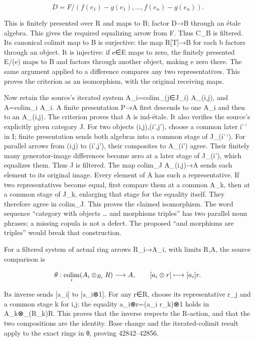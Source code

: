 \[
D=F/(f(e_1)-g(e_1),\ldots,f(e_n)-g(e_n)).
\]

This is finitely presented over R and maps to B; factor D→B through an étale algebra. This gives the required equalizing arrow from F. Thus C\_B is filtered. Its canonical colimit map to B is surjective: the map R{[}T{]}→B for each b factors through an object. It is injective: if e∈E maps to zero, the finitely presented E/(e) maps to B and factors through another object, making e zero there. The same argument applied to a difference compares any two representatives. This proves the criterion as an isomorphism, with the original receiving maps.

Now retain the source's iterated system A\_i=colim\_(j∈J\_i) A\_(i,j), and A=colim\_i A\_i. A finite presentation P→A first descends to one A\_i and then to an A\_(i,j). The criterion proves that A is ind-étale. It also verifies the source's explicitly given category J. For two objects (i,j),(i',j'), choose a common later i'\,' in I; finite presentation sends both algebras into a common stage of J\_(i'\,`). For parallel arrows from (i,j) to (i',j'), their composites to A\_(i') agree. Their finitely many generator-image differences become zero at a later stage of J\_(i'), which equalizes them. Thus J is filtered. The map colim\_J A\_(i,j)→A sends each element to its original image. Every element of A has such a representative. If two representatives become equal, first compare them at a common A\_k, then at a common stage of J\_k, enlarging that stage for the equality itself. They therefore agree in colim\_J. This proves the claimed isomorphism. The word sequence ``category with objects \ldots{} and morphisms triples'' has two parallel noun phrases; a missing copula is not a defect. The proposed ``and morphisms are triples'' would break that construction.

For a filtered system of actual ring arrows R\_i→A\_i, with limits R,A, the source comparison is

\[
\theta:\mathop{\rm colim}_i(A_i\otimes_{R_i}R)\longrightarrow A,
\qquad [a_i\otimes r]\longmapsto [a_i]r.
\]

Its inverse sends {[}a\_i{]} to {[}a\_i⊗1{]}. For any r∈R, choose its representative r\_j and a common stage k for i,j; the equality a\_i⊗r=(a\_i r\_k)⊗1 holds in A\_k⊗\_(R\_k)R. This proves that the inverse respects the R-action, and that the two compositions are the identity. Base change and the iterated-colimit result apply to the exact rings in θ, proving 42842--42856.

